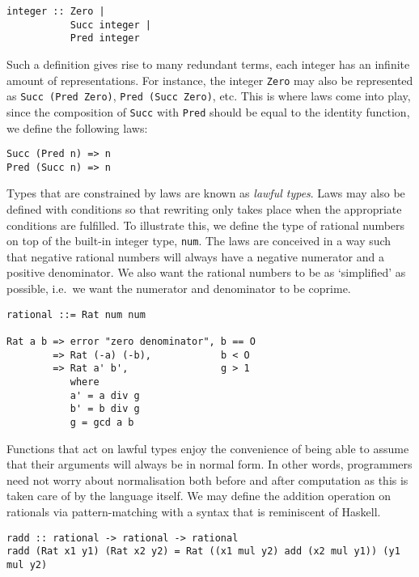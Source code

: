 \documentclass[12pt,twoside,maitrise]{dms}
\theoremstyle{definition}
\numberwithin{equation}{section}
\numberwithin{table}{chapter}
\numberwithin{figure}{chapter}
\newcommand\id[1] {\texttt{#1}}
\newcommand\fn[1] {\texttt{#1}}
\begin{document}
\begin{verbatim}
integer :: Zero |
           Succ integer |
           Pred integer
\end{verbatim}

Such a definition gives rise to many redundant terms, each integer has an
infinite amount of representations. For instance, the integer \id{Zero} may also
be represented as \fn{Succ (Pred Zero)}, \fn{Pred (Succ Zero)}, etc. This is
where laws come into play, since the composition of \id{Succ} with \id{Pred}
should be equal to the identity function, we define the following laws:

\begin{verbatim}
Succ (Pred n) => n
Pred (Succ n) => n
\end{verbatim}

Types that are constrained by laws are known as \emph{lawful types}. Laws may
also be defined with conditions so that rewriting only takes place when the
appropriate conditions are fulfilled. To illustrate this, we define the type of
rational numbers on top of the built-in integer type, \id{num}. The laws are
conceived in a way such that negative rational numbers will always have a
negative numerator and a positive denominator. We also want the rational numbers
to be as `simplified' as possible, i.e.\ we want the numerator and denominator
to be coprime.

\begin{verbatim}
rational ::= Rat num num

Rat a b => error "zero denominator", b == O
        => Rat (-a) (-b),            b < O
        => Rat a' b',                g > 1
           where
           a' = a div g
           b' = b div g
           g = gcd a b
\end{verbatim}

Functions that act on lawful types enjoy the convenience of being able to assume
that their arguments will always be in normal form. In other words, programmers
need not worry about normalisation both before and after computation as this is
taken care of by the language itself. We may define the addition operation on
rationals via pattern-matching with a syntax that is reminiscent of Haskell.

\begin{verbatim}
radd :: rational -> rational -> rational
radd (Rat x1 y1) (Rat x2 y2) = Rat ((x1 mul y2) add (x2 mul y1)) (y1 mul y2)
\end{verbatim}
\end{document}
